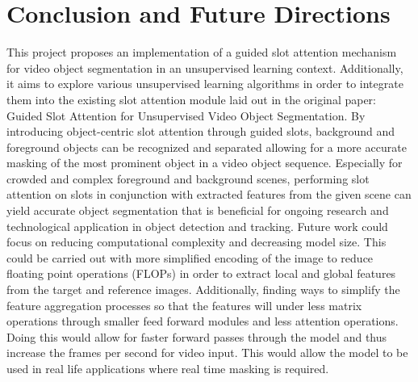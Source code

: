 \documentclass{article}
\theoremstyle{plain}
\theoremstyle{definition}
\theoremstyle{remark}
\begin{document}
\section*{Conclusion and Future Directions}
This project proposes an implementation of a guided slot attention mechanism for video object segmentation in an unsupervised learning context. Additionally, it aims to explore various unsupervised learning algorithms in order to integrate them into the existing slot attention module laid out in the original paper: Guided Slot Attention for Unsupervised Video Object Segmentation. By introducing object-centric slot attention through guided slots, background and foreground objects can be recognized and separated allowing for a more accurate masking of the most prominent object in a video object sequence.  Especially for crowded and complex foreground and background scenes, performing slot attention on slots in conjunction with extracted features from the given scene can yield accurate object segmentation that is beneficial for ongoing research and technological application in object detection and tracking.
Future work could focus on reducing computational complexity and decreasing model size. This could be carried out with more simplified encoding of the image to reduce floating point operations (FLOPs) in order to extract local and global features from the target and reference images. Additionally, finding ways to simplify the feature aggregation processes so that the features will under less matrix operations through smaller feed forward modules and less attention operations. Doing this would allow for faster forward passes through the model and thus increase the frames per second for video input. This would allow the model to be used in real life applications where real time masking is required.

\FloatBarrier
\end{document}
